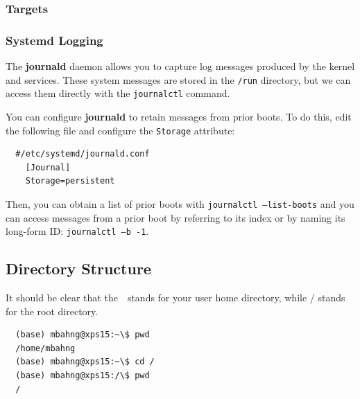 \subsubsection{Targets}

\subsubsection{Systemd Logging}

  The \textbf{journald} daemon allows you to capture log messages produced by the kernel and services. These system messages are stored in the \texttt{/run} directory, but we can access them directly with the \texttt{journalctl}  command. 

  \begin{example}
    
  \end{example}

  You can configure \textbf{journald} to retain messages from prior boots. To do this, edit the following file and configure the \texttt{Storage} attribute: 
  \begin{lstlisting}
  #/etc/systemd/journald.conf
    [Journal]
    Storage=persistent
  \end{lstlisting}

  Then, you can obtain a list of prior boots with \texttt{journalctl --list-boots} and you can access messages from a prior boot by referring to its index or by naming its long-form ID: \texttt{journalctl --b -1}. 

\subsection{Directory Structure} 

  It should be clear that the $\texttt{~}$ stands for your user home directory, while $\texttt{/}$ stands for the root directory. 
  \begin{lstlisting}
  (base) mbahng@xps15:~\$ pwd
  /home/mbahng
  (base) mbahng@xps15:~\$ cd /
  (base) mbahng@xps15:/\$ pwd
  /
  \end{lstlisting}

